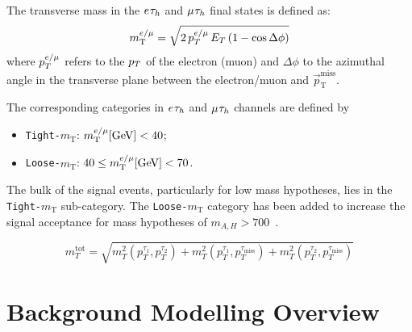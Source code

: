 The transverse mass in the $e_{}\tau_{h}$ and $\mu_{}\tau_{h}$ final states is defined as:
\begin{equation}
m_{\text{T}}^{e/\mu} = \sqrt{2 \, p_{T}^{e/\mu} \, E_{T} \, (1-\cos\Delta\phi)}
\end{equation}
where $p_{T}^{e/\mu}$ refers to the $p_{T}$ of the electron (muon) and $\Delta\phi$ to the azimuthal angle in the transverse plane between the electron/muon and $\vec{p}_\text{T}^\text{miss}$.

The corresponding categories in $e_{}\tau_{h}$ and $\mu_{}\tau_{h}$ channels are defined by
\begin{itemize}
\item \texttt{Tight-$m_{\text{T}}$}: $m_{\text{T}}^{e/\mu} [\text{GeV}] < 40$;
\item \texttt{Loose-$m_{\text{T}}$}: $40 \leq m_{\text{T}}^{e/\mu} [\text{GeV}] < 70$.
\end{itemize}
The bulk of the signal events, particularly for low mass hypotheses, lies in the \texttt{Tight-$m_{\text{T}}$} sub-category.
The \texttt{Loose-$m_{\text{T}}$} category has been added to increase the signal acceptance for mass hypotheses of $m_{A,H} > 700$~\GeV.

\begin{equation}
m_{T}^{\text{tot}} = \sqrt{m_{T}^{2}(p_{T}^{\tau_{1}},p_{T}^{\tau_{2}}) + m_{T}^{2}(p_{T}^{\tau_{1}},p_{T}^{\tau_{\text{miss}}}) + m_{T}^{2}(p_{T}^{\tau_{2}},p_{T}^{\tau_{\text{miss}}})}
\end{equation}

\section{Background Modelling Overview}

